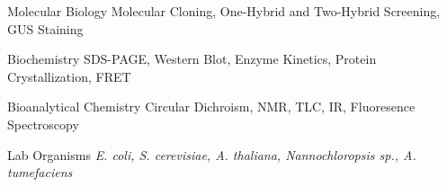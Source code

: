 \vspace{2mm}

\begin{cvskills}

  \cvskill
    {Molecular Biology} %
    {Molecular Cloning, One-Hybrid and Two-Hybrid Screening, GUS Staining} %

  \cvskill
    {Biochemistry} %
    {SDS-PAGE, Western Blot, Enzyme Kinetics, Protein Crystallization, FRET} %

  \cvskill
    {Bioanalytical Chemistry} %
    {Circular Dichroism, NMR, TLC, IR, Fluoresence Spectroscopy} %

  \cvskill
    {Lab Organisms} %
    {\textit{E. coli, S. cerevisiae, A. thaliana, Nannochloropsis sp., A. tumefaciens}} %
  
\vspace{-8.0mm}
\end{cvskills}